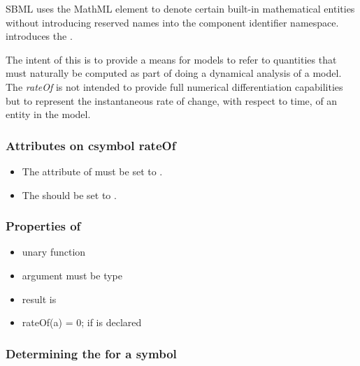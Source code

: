 SBML uses the MathML  element to denote certain built-in mathematical entities without introducing reserved names into the component identifier namespace.
\ThisPackage introduces the  .


The intent of this  is to provide a means for models to refer to quantities that must naturally be computed as part of doing a dynamical analysis of a model.  The \emph{rateOf}  is not intended to provide full numerical differentiation capabilities but to represent the instantaneous rate of change, with respect to time, of an entity in the model. 

\subsubsection{Attributes on csymbol rateOf}

\begin{itemize}
 
\item The  attribute of  must be set to .  

\item The  should be set to .

\end{itemize}

\subsubsection{Properties of }

\begin{itemize}\setlength{\parskip}{-0.3ex}

\item unary function

\item argument must be type 

\item result is 

\item rateOf(a) = 0;  if  is declared 


\end{itemize}

\subsubsection{Determining the  for a symbol }

